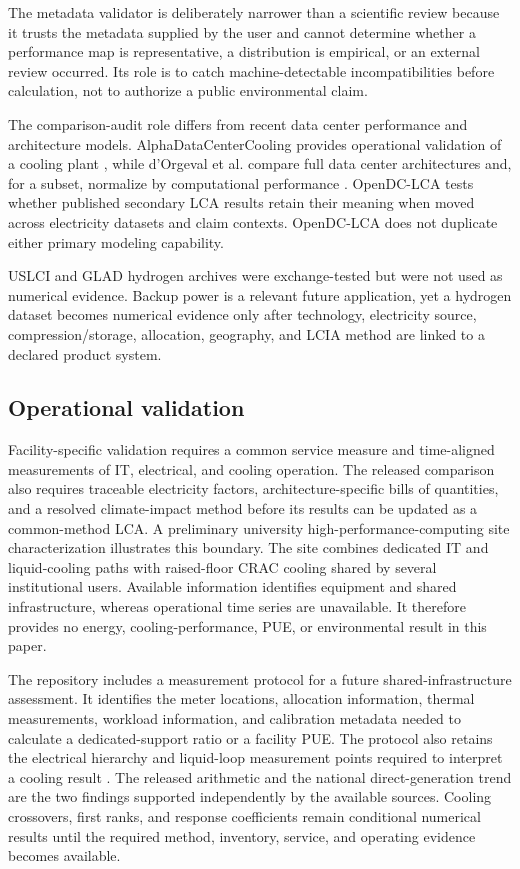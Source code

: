 \documentclass[review,a4paper,fleqn]{cas-sc}
\begin{document}
The metadata validator is deliberately narrower than a scientific review because it trusts the metadata supplied by the user and cannot determine whether a performance map is representative, a distribution is empirical, or an external review occurred. Its role is to catch machine-detectable incompatibilities before calculation, not to authorize a public environmental claim.

The comparison-audit role differs from recent data center performance and architecture models. AlphaDataCenterCooling provides operational validation of a cooling plant \cite{ref17}, while d'Orgeval et al. compare full data center architectures and, for a subset, normalize by computational performance \cite{ref16}. OpenDC-LCA tests whether published secondary LCA results retain their meaning when moved across electricity datasets and claim contexts. OpenDC-LCA does not duplicate either primary modeling capability.

USLCI and GLAD hydrogen archives were exchange-tested but were not used as numerical evidence. Backup power is a relevant future application, yet a hydrogen dataset becomes numerical evidence only after technology, electricity source, compression/storage, allocation, geography, and LCIA method are linked to a declared product system.

\subsection{Operational validation}
Facility-specific validation requires a common service measure and time-aligned measurements of IT, electrical, and cooling operation. The released comparison also requires traceable electricity factors, architecture-specific bills of quantities, and a resolved climate-impact method before its results can be updated as a common-method LCA. A preliminary university high-performance-computing site characterization illustrates this boundary. The site combines dedicated IT and liquid-cooling paths with raised-floor CRAC cooling shared by several institutional users. Available information identifies equipment and shared infrastructure, whereas operational time series are unavailable. It therefore provides no energy, cooling-performance, PUE, or environmental result in this paper.

The repository includes a measurement protocol for a future shared-infrastructure assessment. It identifies the meter locations, allocation information, thermal measurements, workload information, and calibration metadata needed to calculate a dedicated-support ratio or a facility PUE. The protocol also retains the electrical hierarchy and liquid-loop measurement points required to interpret a cooling result \cite{ref53,ref54,ref55,ref56}. The released arithmetic and the national direct-generation trend are the two findings supported independently by the available sources. Cooling crossovers, first ranks, and response coefficients remain conditional numerical results until the required method, inventory, service, and operating evidence becomes available.
\end{document}
